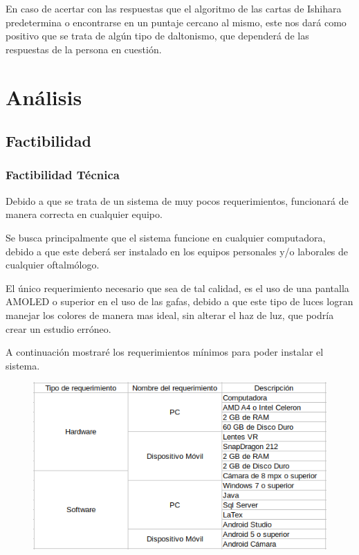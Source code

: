 \documentclass[10pt]{article}
\begin{document}
En caso de acertar con las respuestas que el algoritmo de las cartas de Ishihara predetermina o encontrarse en un puntaje cercano al mismo, este nos dará como positivo que se trata de algún tipo de daltonismo, que dependerá de las respuestas de la persona en cuestión.

\section{Análisis}

\subsection{Factibilidad}
\subsubsection{Factibilidad Técnica}

Debido a que se trata de un sistema de muy pocos requerimientos, funcionará de manera correcta en cualquier equipo.

Se busca principalmente que el sistema funcione en cualquier computadora, debido a que este deberá ser instalado en los equipos personales y/o laborales de cualquier oftalmólogo.

El único requerimiento necesario que sea de tal calidad, es el uso de una pantalla AMOLED o superior en el uso de las gafas, debido a que este tipo de luces logran manejar los colores de manera mas ideal, sin alterar el haz de luz, que podría crear un estudio erróneo.

A continuación mostraré los requerimientos mínimos para poder instalar el sistema.


\begin{figure}[H]
	\begin{center}
\includegraphics[scale = 0.80]{Imagenes/tabla.png}
	\end{center} 
\end{figure}
\end{document}
